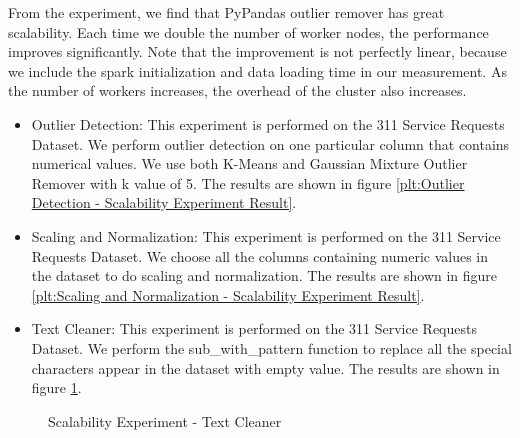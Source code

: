 \documentclass[sigconf]{acmart}
\begin{document}
From the experiment, we find that PyPandas outlier remover has great scalability. Each time we double the number of worker nodes, the performance improves significantly. Note that the improvement is not perfectly linear, because we include the spark initialization and data loading time in our measurement. As the number of workers increases, the overhead of the cluster also increases.
\begin{itemize}
	\item{Outlier Detection}: This experiment is performed on the 311 Service Requests Dataset. We perform outlier detection on one particular column that contains numerical values. We use both K-Means and Gaussian Mixture Outlier Remover with k value of 5.  The results are shown in figure \ref{plt:Outlier Detection - Scalability Experiment Result}.
	\item{Scaling and Normalization}: This experiment is performed on the 311 Service Requests Dataset. We choose all the columns containing numeric values in the dataset to do scaling and normalization. The results are shown in figure \ref{plt:Scaling and Normalization - Scalability Experiment Result}.
	\item{Text Cleaner}: This experiment is performed on the 311 Service Requests Dataset. We perform the sub\_with\_pattern function to replace all the special characters appear in the dataset with empty value. The results are shown in figure \ref{plt:Text Cleaner - Scalability Experiment Result}.
\end{itemize}

\begin{figure}
\caption{Scalability Experiment - Text Cleaner}   
\label{plt:Text Cleaner - Scalability Experiment Result}
\end{figure}
\end{document}
